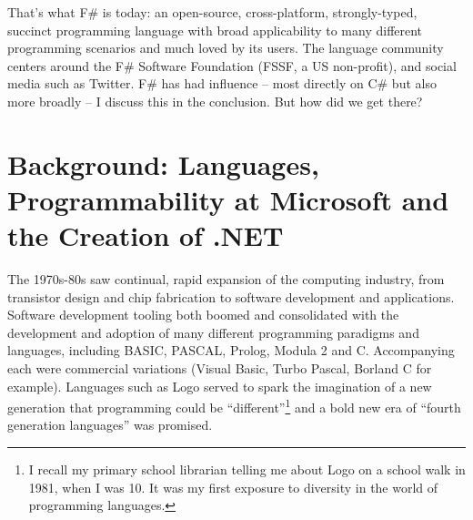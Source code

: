 \documentclass[acmsmall,review]{acmart}\settopmatter{printfolios=true,printccs=false,printacmref=false}
\begin{document}
That's what F\# is today: an open-source, cross-platform, strongly-typed, succinct programming language with broad applicability to many different programming scenarios and much loved by its users.  The language community centers around the F\# Software Foundation (FSSF, a US non-profit), and social media such as Twitter. F\# has had influence – most directly on C\# but also more broadly – I discuss this in the conclusion.  But how did we get there?

\section*{Background: Languages, Programmability at Microsoft and the Creation of .NET}

The 1970s-80s saw continual, rapid expansion of the computing industry, from transistor design and chip fabrication to software development and applications. Software development tooling both boomed and consolidated with the development and adoption of many different programming paradigms and languages, including BASIC, PASCAL, Prolog, Modula 2 and C.  Accompanying each were commercial variations (Visual Basic, Turbo Pascal, Borland C for example). Languages such as Logo served to spark the imagination of a new generation that programming could be “different”\footnote{ I recall my primary school librarian telling me about Logo on a school walk in 1981, when I was 10. It was my first exposure to diversity in the world of programming languages.} and a bold new era of “fourth generation languages” was promised. 
\end{document}
